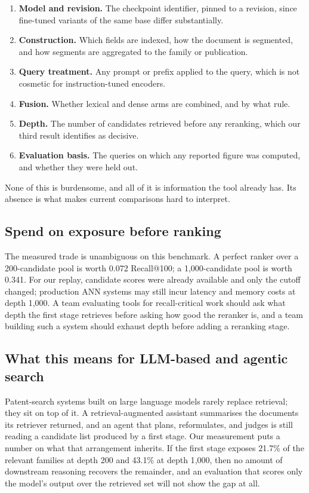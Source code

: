 \documentclass[preprint,11pt,authoryear]{elsarticle}          %
\begin{document}
\begin{enumerate}
\item \textbf{Model and revision.} The checkpoint identifier, pinned to a revision, since fine-tuned variants of the same base differ substantially.
\item \textbf{Construction.} Which fields are indexed, how the document is segmented, and how segments are aggregated to the family or publication.
\item \textbf{Query treatment.} Any prompt or prefix applied to the query, which is not cosmetic for instruction-tuned encoders.
\item \textbf{Fusion.} Whether lexical and dense arms are combined, and by what rule.
\item \textbf{Depth.} The number of candidates retrieved before any reranking, which our third result identifies as decisive.
\item \textbf{Evaluation basis.} The queries on which any reported figure was computed, and whether they were held out.
\end{enumerate}

None of this is burdensome, and all of it is information the tool already has. Its absence is what makes current comparisons hard to interpret.

\subsection{Spend on exposure before ranking}

The measured trade is unambiguous on this benchmark. A perfect ranker over a 200-candidate pool is worth 0.072 Recall@100; a 1{,}000-candidate pool is worth 0.341. For our replay, candidate scores were already available and only the cutoff changed; production ANN systems may still incur latency and memory costs at depth 1{,}000. A team evaluating tools for recall-critical work should ask what depth the first stage retrieves before asking how good the reranker is, and a team building such a system should exhaust depth before adding a reranking stage.

\subsection{What this means for LLM-based and agentic search}

Patent-search systems built on large language models rarely replace retrieval; they sit
on top of it. A retrieval-augmented assistant summarises the documents its retriever
returned, and an agent that plans, reformulates, and judges is still reading a candidate
list produced by a first stage. Our measurement puts a number on what that arrangement
inherits. If the first stage exposes 21.7\% of the relevant families at depth 200 and
43.1\% at depth 1{,}000, then no amount of downstream reasoning recovers the remainder,
and an evaluation that scores only the model's output over the retrieved set will not
show the gap at all.
\end{document}
